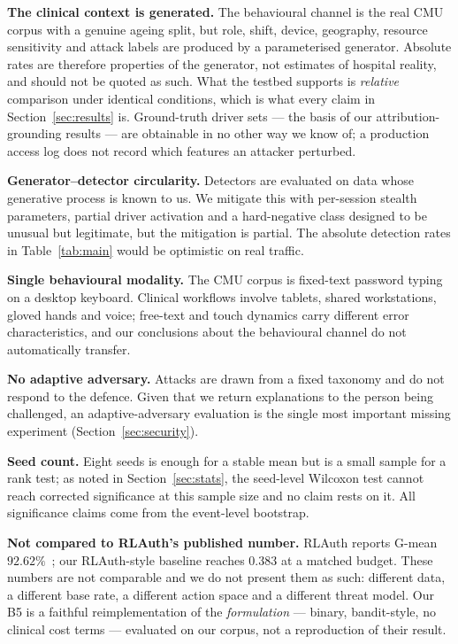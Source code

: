 \documentclass[conference]{IEEEtran}
\begin{document}
\textbf{The clinical context is generated.} The behavioural channel is the real
CMU corpus with a genuine ageing split, but role, shift, device, geography,
resource sensitivity and attack labels are produced by a parameterised
generator. Absolute rates are therefore properties of the generator, not
estimates of hospital reality, and should not be quoted as such. What the
testbed supports is \emph{relative} comparison under identical conditions,
which is what every claim in Section~\ref{sec:results} is. Ground-truth driver
sets --- the basis of our attribution-grounding results --- are obtainable in no
other way we know of; a production access log does not record which features an
attacker perturbed.

\textbf{Generator--detector circularity.} Detectors are evaluated on data whose
generative process is known to us. We mitigate this with per-session stealth
parameters, partial driver activation and a hard-negative class designed to be
unusual but legitimate, but the mitigation is partial. The absolute detection
rates in Table~\ref{tab:main} would be optimistic on real traffic.

\textbf{Single behavioural modality.} The CMU corpus is fixed-text password
typing on a desktop keyboard. Clinical workflows involve tablets, shared
workstations, gloved hands and voice; free-text and touch dynamics carry
different error characteristics, and our conclusions about the behavioural
channel do not automatically transfer.

\textbf{No adaptive adversary.} Attacks are drawn from a fixed taxonomy and do
not respond to the defence. Given that we return explanations to the person
being challenged, an adaptive-adversary evaluation is the single most important
missing experiment (Section~\ref{sec:security}).

\textbf{Seed count.} Eight seeds is enough for a stable mean but is a small
sample for a rank test; as noted in Section~\ref{sec:stats}, the seed-level
Wilcoxon test cannot reach corrected significance at this sample size and no
claim rests on it. All significance claims come from the event-level bootstrap.

\textbf{Not compared to RLAuth's published number.} RLAuth reports G-mean
$92.62\%$~\cite{rlauth}; our RLAuth-style baseline reaches $0.383$ at a matched
budget. These numbers are not comparable and we do not present them as such:
different data, a different base rate, a different action space and a
different threat model. Our B5 is a faithful reimplementation of the
\emph{formulation} --- binary, bandit-style, no clinical cost terms --- evaluated
on our corpus, not a reproduction of their result.
\end{document}
